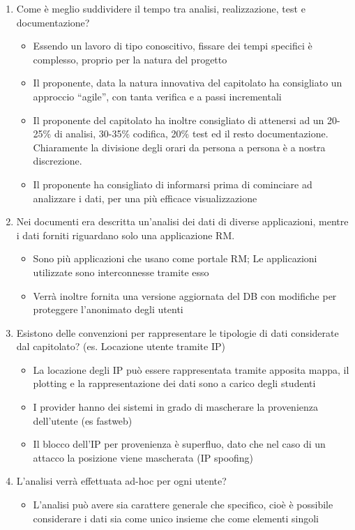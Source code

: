 \begin{enumerate}
	\item Come è meglio suddividere il tempo tra analisi, realizzazione, test e documentazione?
	\begin{itemize}
		\item Essendo un lavoro di tipo conoscitivo, fissare dei tempi specifici è complesso, proprio per la natura del progetto
		\item Il proponente, data la natura innovativa del capitolato ha consigliato un approccio ``agile'', con tanta verifica e a passi incrementali
		\item Il proponente del capitolato ha inoltre consigliato di attenersi ad un 20-25\% di analisi, 30-35\% codifica, 20\% test ed il resto documentazione. Chiaramente la divisione degli orari da persona a persona è a nostra discrezione.
		\item Il proponente ha consigliato di informarsi prima di cominciare ad analizzare i dati, per una più efficace visualizzazione
	\end{itemize}

	\item Nei documenti era descritta un'analisi dei dati di diverse applicazioni, mentre i dati forniti riguardano solo una applicazione RM.
	\begin{itemize}
		\item Sono più applicazioni che usano come portale RM; Le applicazioni utilizzate sono interconnesse tramite esso
		\item Verrà inoltre fornita una versione aggiornata del DB con modifiche per proteggere l'anonimato degli utenti
	\end{itemize}

	\item Esistono delle convenzioni per rappresentare le tipologie di dati considerate dal capitolato? (es. Locazione utente tramite IP)
	\begin{itemize}
		\item La locazione degli IP può essere rappresentata tramite apposita mappa, il plotting e la rappresentazione dei dati sono a carico degli studenti
		\item I provider hanno dei sistemi in grado di mascherare la provenienza dell'utente (es fastweb)
		\item Il blocco dell'IP per provenienza è superfluo, dato che nel caso di un attacco la posizione viene mascherata (IP spoofing)
	\end{itemize}

	\item L'analisi verrà effettuata ad-hoc per ogni utente?
	\begin{itemize}
		\item L'analisi può avere sia carattere generale che specifico, cioè è possibile considerare i dati sia come unico insieme che come elementi singoli
	\end{itemize}
\end{enumerate}

